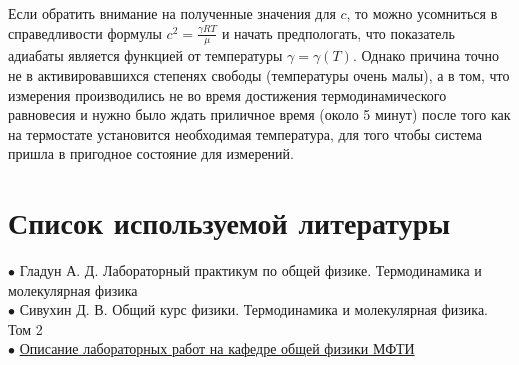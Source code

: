 \documentclass[a4paper, 12pt]{article} %
\begin{document}
    Если обратить внимание на полученные значения для $c$, то можно усомниться в справедливости формулы $c^2 = \frac{\gamma R T}{\mu}$ и начать предпологать, что показатель адиабаты является функцией от температуры $\gamma = \gamma(T)$. Однако причина точно не в активировавшихся степенях свободы (температуры очень малы), а в том, что  измерения производились не во время достижения термодинамического равновесия и нужно было ждать приличное время (около 5 минут) после того как на термостате установится необходимая температура, для того чтобы система пришла в пригодное состояние для измерений.


\section{Список используемой литературы}

$\bullet$ Гладун А. Д. Лабораторный практикум по общей физике. Термодинамика и молекулярная физика\\

$\bullet$ Сивухин Д. В. Общий курс физики. Термодинамика и молекулярная физика. Том 2\\

$\bullet$ \href{https://mipt.ru/education/chair/physics/S_II/lab/}{Описание лабораторных работ на кафедре общей физики МФТИ}
\end{document}
